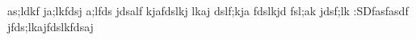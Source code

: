 as;ldkf ja;lkfdsj a;lfds jdsalf kjafdslkj lkaj
dslf;kja fdslkjd fsl;ak jdsf;lk :SDfasfasdf
jfds;lkajfdslkfdsaj 
